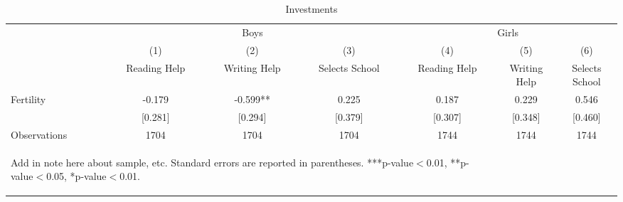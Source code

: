 \begin{table}[htbp]\centering
\def\sym#1{\ifmmode^{#1}\else\(^{#1}\)\fi}
\caption{Investments}
\begin{tabular}{l*{6}{c}}
\toprule
                    &\multicolumn{3}{c}{Boys}                       &\multicolumn{3}{c}{Girls}                      \\\cmidrule(lr){2-4}\cmidrule(lr){5-7}
                    &\multicolumn{1}{c}{(1)}   &\multicolumn{1}{c}{(2)}   &\multicolumn{1}{c}{(3)}   &\multicolumn{1}{c}{(4)}   &\multicolumn{1}{c}{(5)}   &\multicolumn{1}{c}{(6)}   \\
                    &Reading Help   &Writing Help   &Selects School   &Reading Help   &Writing Help   &Selects School   \\
\midrule
Fertility           &      -0.179   &      -0.599** &       0.225   &       0.187   &       0.229   &       0.546   \\
                    &     [0.281]   &     [0.294]   &     [0.379]   &     [0.307]   &     [0.348]   &     [0.460]   \\
\midrule
Observations        &        1704   &        1704   &        1704   &        1744   &        1744   &        1744   \\
\bottomrule\multicolumn{5}{p{14.6cm}}{\begin{footnotesize}        
Add in note here about sample, etc. Standard errors are reported in parentheses. ***p-value$<$0.01, **p-value$<$0.05, *p-value$<$0.01.                                
\end{footnotesize}}\end{tabular}\end{table}
